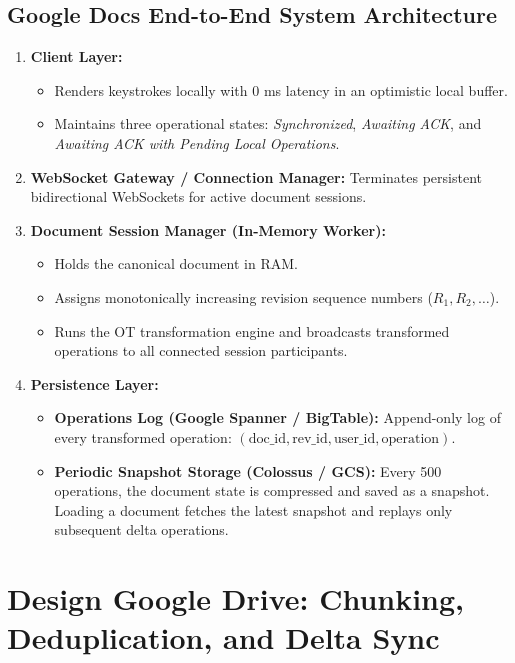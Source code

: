 \documentclass[10pt,journal,compsoc,onecolumn]{IEEEtran}
\begin{document}
\subsection{Google Docs End-to-End System Architecture}
\begin{enumerate}
    \item \textbf{Client Layer:}
    \begin{itemize}
        \item Renders keystrokes locally with 0 ms latency in an optimistic local buffer.
        \item Maintains three operational states: \emph{Synchronized}, \emph{Awaiting ACK}, and \emph{Awaiting ACK with Pending Local Operations}.
    \end{itemize}
    \item \textbf{WebSocket Gateway / Connection Manager:} Terminates persistent bidirectional WebSockets for active document sessions.
    \item \textbf{Document Session Manager (In-Memory Worker):}
    \begin{itemize}
        \item Holds the canonical document in RAM.
        \item Assigns monotonically increasing revision sequence numbers ($R_1, R_2, \dots$).
        \item Runs the OT transformation engine and broadcasts transformed operations to all connected session participants.
    \end{itemize}
    \item \textbf{Persistence Layer:}
    \begin{itemize}
        \item \textbf{Operations Log (Google Spanner / BigTable):} Append-only log of every transformed operation: $(\text{doc\_id}, \text{rev\_id}, \text{user\_id}, \text{operation})$.
        \item \textbf{Periodic Snapshot Storage (Colossus / GCS):} Every 500 operations, the document state is compressed and saved as a snapshot. Loading a document fetches the latest snapshot and replays only subsequent delta operations.
    \end{itemize}
\end{enumerate}

\section{Design Google Drive: Chunking, Deduplication, and Delta Sync}
\label{sec:google_drive}
\end{document}
